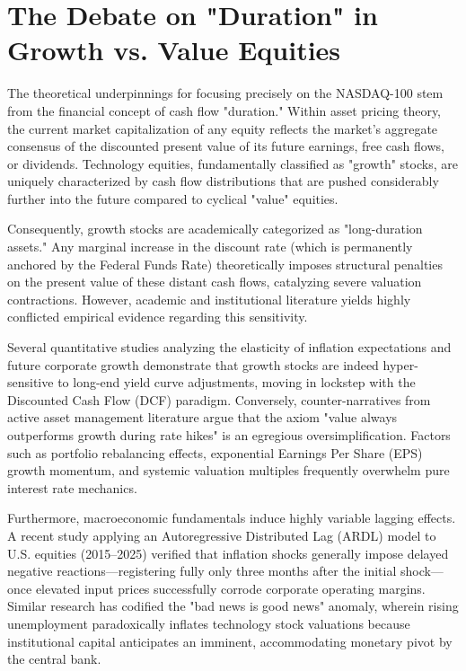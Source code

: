 \documentclass[12pt,a4paper]{report}
\begin{document}
\section{The Debate on "Duration" in Growth vs. Value Equities}
The theoretical underpinnings for focusing precisely on the NASDAQ-100 stem from the financial concept of cash flow "duration." Within asset pricing theory, the current market capitalization of any equity reflects the market's aggregate consensus of the discounted present value of its future earnings, free cash flows, or dividends. Technology equities, fundamentally classified as "growth" stocks, are uniquely characterized by cash flow distributions that are pushed considerably further into the future compared to cyclical "value" equities. 

Consequently, growth stocks are academically categorized as "long-duration assets." Any marginal increase in the discount rate (which is permanently anchored by the Federal Funds Rate) theoretically imposes structural penalties on the present value of these distant cash flows, catalyzing severe valuation contractions. However, academic and institutional literature yields highly conflicted empirical evidence regarding this sensitivity.

Several quantitative studies analyzing the elasticity of inflation expectations and future corporate growth demonstrate that growth stocks are indeed hyper-sensitive to long-end yield curve adjustments, moving in lockstep with the Discounted Cash Flow (DCF) paradigm. Conversely, counter-narratives from active asset management literature argue that the axiom "value always outperforms growth during rate hikes" is an egregious oversimplification. Factors such as portfolio rebalancing effects, exponential Earnings Per Share (EPS) growth momentum, and systemic valuation multiples frequently overwhelm pure interest rate mechanics.

Furthermore, macroeconomic fundamentals induce highly variable lagging effects. A recent study applying an Autoregressive Distributed Lag (ARDL) model to U.S. equities (2015–2025) verified that inflation shocks generally impose delayed negative reactions—registering fully only three months after the initial shock—once elevated input prices successfully corrode corporate operating margins. Similar research has codified the "bad news is good news" anomaly, wherein rising unemployment paradoxically inflates technology stock valuations because institutional capital anticipates an imminent, accommodating monetary pivot by the central bank.
\end{document}
